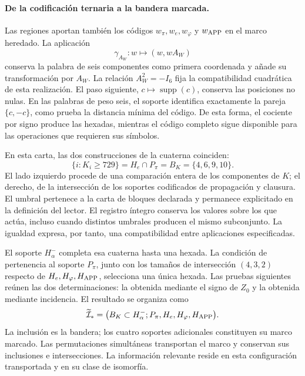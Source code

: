 \paragraph{De la codificación ternaria a la bandera marcada.}
\label{inc-ampl-bandera}
Las regiones aportan también los códigos $w_\pi,w_e,w_\varphi$ y
$w_{\rm APP}$ en el marco heredado. La aplicación
\[
 \gamma_{A_W}:w\longmapsto(w,wA_W)
\]
conserva la palabra de seis componentes como primera coordenada y añade
su transformación por $A_W$. La relación $A_W^2=-I_6$ fija la
compatibilidad cuadrática de esta realización. El paso siguiente,
$c\mapsto\operatorname{supp}(c)$, conserva las posiciones no nulas.
En las palabras de peso seis, el soporte identifica exactamente la pareja
$\{c,-c\}$, como prueba la distancia mínima del código. De esta forma,
el cociente por signo produce las hexadas, mientras el código completo
sigue disponible para las operaciones que requieren sus símbolos.

En esta carta, las dos construcciones de la cuaterna coinciden:
\begin{equation}
 \{i:K_i\geq729\}
 =H_e\cap P_\pi=B_K=\{4,6,9,10\}.
 \label{inc-ampl-cuaterna}
\end{equation}
El lado izquierdo procede de una comparación entera de los componentes
de $K$; el derecho, de la intersección de los soportes codificados de
propagación y clausura. El umbral pertenece a la carta de bloques
declarada y permanece explicitado en la definición del lector. El
registro íntegro conserva los valores sobre los que actúa, incluso cuando
distintos umbrales producen el mismo subconjunto. La igualdad expresa,
por tanto, una compatibilidad entre aplicaciones especificadas.

El soporte $H^-_\alpha$ completa esa cuaterna hasta una hexada. La
condición de pertenencia al soporte $P_\pi$, junto con los tamaños de
intersección $(4,3,2)$ respecto de $H_e,H_\varphi,H_{\rm APP}$,
selecciona una única hexada. Las pruebas siguientes reúnen las dos
determinaciones: la obtenida mediante el signo de $Z_0$ y la obtenida
mediante incidencia. El resultado se organiza como
\begin{equation}
 \widetilde{\mathcal I}_*
 =\bigl(B_K\subset H^-_\alpha;
         P_\pi,H_e,H_\varphi,H_{\rm APP}\bigr).
 \label{inc-ampl-marco}
\end{equation}
La inclusión es la bandera; los cuatro soportes adicionales constituyen
su marco marcado. Las permutaciones simultáneas transportan el marco y
conservan sus inclusiones e intersecciones. La información relevante reside
en esta configuración transportada y en su clase de isomorfía.


